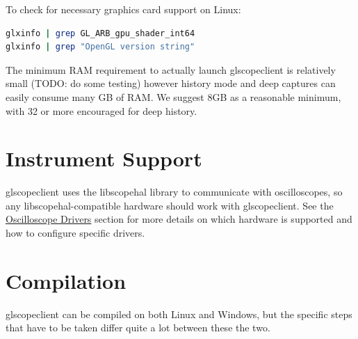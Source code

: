 To check for necessary graphics card support on Linux:
\begin{lstlisting}[language=sh]
glxinfo | grep GL_ARB_gpu_shader_int64
glxinfo | grep "OpenGL version string"
\end{lstlisting}

The minimum RAM requirement to actually launch glscopeclient is relatively small (TODO: do some testing) however
history mode and deep captures can easily consume many GB of RAM. We suggest 8GB as a reasonable minimum, with 32 or
more encouraged for deep history.

\section{Instrument Support}

glscopeclient uses the libscopehal library to communicate with oscilloscopes, so any libscopehal-compatible hardware
should work with glscopeclient. See the \hyperref[sec:drivers]{Oscilloscope Drivers} section for more details on which
hardware is supported and how to configure specific drivers.

\section{Compilation}

glscopeclient can be compiled on both Linux and Windows, but the specific steps that have to be taken differ quite a
lot between these the two.

